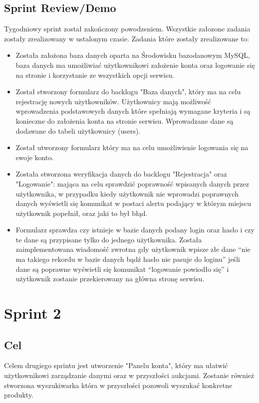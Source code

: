 \documentclass[a4paper]{article}
\begin{document}
	\subsection{Sprint Review/Demo}
	Tygodniowy sprint został zakończony powodzeniem. Wszystkie załozone zadania zostały zrealizowany w ustalonym czasie. Zadania które zostały zrealizowane to:
\begin{itemize}
\item Została założona baza danych oparta na Środowisku bazodanowym MySQL, baza danych ma umożliwiać użytkownikowi założenie konta oraz logowanie się na stronie i korzystanie ze wszystkich opcji serwisu.
\item Został stworzony formularz do backlogu "Baza danych", który ma na celu rejestrację nowych użytkowników. Użytkownicy mają możliwość wprowadzenia podstawowych danych które spełniają wymagane kryteria i są konieczne do założenia konta na stronie serwisu. Wprowadzane dane są dodawane do tabeli użytkownicy (users).
\item Został utworzony formularz który ma na celu umożliwienie logowania się na swoje konto. 
\item Została stworzona weryfikacja danych do backlogu "Rejestracja" oraz "Logowanie": mająca na celu sprawdzić poprawność wpisanych danych przez użytkownika, w przypadku kiedy użytkownik nie wprowadzi poprawnych danych wyświetli się komunikat w postaci alertu podający w którym miejscu użytkownik popełnił, oraz jaki to był błąd.
\item Formularz sprawdza czy istnieje w bazie danych podany login oraz hasło i czy te dane są przypisane tylko do jednego użytkownika. Została zaimplementowana wiadomość zwrotna gdy użytkownik wpisze złe dane “nie ma takiego rekordu w bazie danych bądź hasło nie pasuje do loginu” jeśli dane są poprawne wyświetli się komunikat “logowanie powiodło się” i użytkownik zostanie przekierowany na główna stronę serwisu.

\end{itemize}

	\section{Sprint 2}
	
	\subsection{Cel} Celem drugiego sprintu jest utworzenie "Panelu konta", który ma ułatwić użytkownikowi zarządzanie danymi oraz w przyszłości aukcjami. Zostanie również stworzona wyszukiwarka która w przyszłości pozowoli wyszukać konkretne produkty.
	
\end{document}
